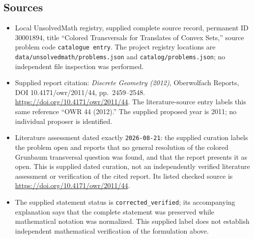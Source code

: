 \documentclass[11pt]{article}
\begin{document}
\subsection{Sources}
\begin{itemize}
\item Local UnsolvedMath registry, supplied complete source record, permanent ID \(30001894\), title ``Colored Transversals for Translates of Convex Sets,'' source problem code \texttt{catalogue entry}. The project registry locations are \texttt{data/unsolvedmath/problems.json} and \texttt{catalog/problems.json}; no independent file inspection was performed.
\item Supplied report citation: \emph{Discrete Geometry (2012)}, Oberwolfach Reports, DOI 10.4171/owr/2011/44, pp.\ 2459--2548. \url{https://doi.org/10.4171/owr/2011/44}. The literature-source entry labels this same reference ``OWR 44 (2012).'' The supplied proposed year is 2011; no individual proposer is identified.
\item Literature assessment dated exactly \texttt{2026-08-21}: the supplied curation labels the problem open and reports that no general resolution of the colored Grunbaum transversal question was found, and that the report presents it as open. This is supplied dated curation, not an independently verified literature assessment or verification of the cited report. Its listed checked source is \url{https://doi.org/10.4171/owr/2011/44}.
\item The supplied statement status is \texttt{corrected\_verified}; its accompanying explanation says that the complete statement was preserved while mathematical notation was normalized. This supplied label does not establish independent mathematical verification of the formulation above.
\end{itemize}
\end{document}
